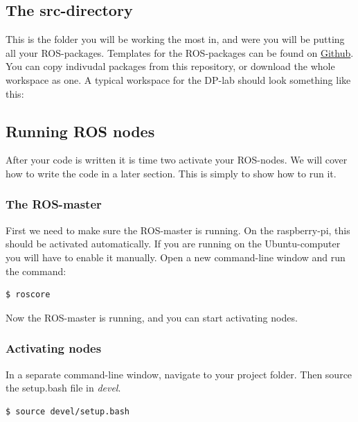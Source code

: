 \documentclass{ol-softwaremanual}
\begin{document}
\subsection{The src-directory}
\label{sec:src}
This is the folder you will be working the most in, and were you will be putting all your ROS-packages. Templates for the ROS-packages can be found on \underline{\href{https://github.com/NTNU-MCS/CS_EnterpriseI/tree/master/ROS1/DP-Lab}{Github}}. You can copy indivudal packages from this repository, or download the whole workspace as one. A typical workspace for the DP-lab should look something like this: 


\subsection{Running ROS nodes}

After your code is written it is time two activate your ROS-nodes. We will cover how to write the code in a later section. This is simply to show how to run it.

\subsubsection{The ROS-master}

First we need to make sure the ROS-master is running. On the raspberry-pi, this should be activated automatically. If you are running on the Ubuntu-computer you will have to enable it manually. Open a new command-line window and run the command: 

\begin{lstlisting}[language=bash,basicstyle=\mlttfamily, breaklines=true]
  $ roscore
\end{lstlisting}

Now the ROS-master is running, and you can start activating nodes.

\subsubsection{Activating nodes}

In a separate command-line window, navigate to your project folder. Then source the setup.bash file in \textit{devel}. 

\begin{lstlisting}[language=bash,basicstyle=\mlttfamily, breaklines=true]
  $ source devel/setup.bash
\end{lstlisting}
\end{document}
